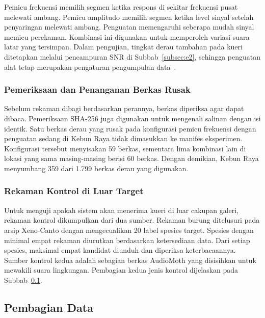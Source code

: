 Pemicu frekuensi memilih segmen ketika respons di sekitar frekuensi pusat melewati ambang. Pemicu amplitudo memilih segmen ketika level sinyal setelah penyaringan melewati ambang. Penguatan memengaruhi seberapa mudah sinyal memicu perekaman. Kombinasi ini digunakan untuk memperoleh variasi suara latar yang tersimpan. Dalam pengujian, tingkat derau tambahan pada kueri ditetapkan melalui pencampuran SNR di Subbab~\ref{subsec:e2}, sehingga penguatan alat tetap merupakan pengaturan pengumpulan data~\cite{oad2024audiomothmanual}.

\subsubsection{Pemeriksaan dan Penanganan Berkas Rusak}

Sebelum rekaman dibagi berdasarkan perannya, berkas diperiksa agar dapat dibaca. Pemeriksaan SHA-256 juga digunakan untuk mengenali salinan dengan isi identik. Satu berkas derau yang rusak pada konfigurasi pemicu frekuensi dengan penguatan sedang di Kebun Raya tidak dimasukkan ke manifes eksperimen. Konfigurasi tersebut menyisakan 59 berkas, sementara lima kombinasi lain di lokasi yang sama masing-masing berisi 60 berkas. Dengan demikian, Kebun Raya menyumbang 359 dari 1.799 berkas derau yang digunakan.

\subsubsection{Rekaman Kontrol di Luar Target}

Untuk menguji apakah sistem akan menerima kueri di luar cakupan galeri, rekaman kontrol dikumpulkan dari dua sumber. Rekaman burung ditelusuri pada arsip Xeno-Canto dengan mengecualikan 20 label spesies target. Spesies dengan minimal empat rekaman diurutkan berdasarkan ketersediaan data. Dari setiap spesies, maksimal empat kandidat diunduh dan diperiksa keterbacaannya. Sumber kontrol kedua adalah sebagian berkas AudioMoth yang disisihkan untuk mewakili suara lingkungan. Pembagian kedua jenis kontrol dijelaskan pada Subbab~\ref{subsec:pemilihan-data}.

\setcounter{secnumdepth}{2}
\subsection{Pembagian Data}
\label{subsec:pemilihan-data}

